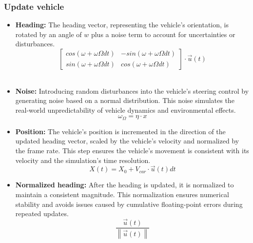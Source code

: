     \subsubsection*{Update vehicle}
    \begin{itemize}
	    \item \textbf{Heading:} The heading vector, representing the vehicle's orientation, is rotated by an angle of $w$ plus a noise term to account for uncertainties or disturbances.\\
        $$\begin{bmatrix}
	        cos(\omega + \omega{\Omega}dt) & -sin(\omega + \omega{\Omega}dt) \\
    	    sin(\omega + \omega{\Omega}dt) & cos(\omega + \omega{\Omega}dt)
        \end{bmatrix}
        \cdot \vec{u}(t)$$\\
	    \item \textbf{Noise:} Introducing random disturbances into the vehicle's steering control by generating noise based on a normal distribution. This noise simulates the real-world unpredictability of vehicle dynamics and environmental effects.\\
		    $$\omega_{\Omega}=\eta\cdot x$$
	    \item \textbf{Position:} The vehicle's position is incremented in the direction of the updated heading vector, scaled by the vehicle's velocity and normalized by the frame rate. This step ensures the vehicle's movement is consistent with its velocity and the simulation's time resolution.\\
		    $$X(t)=X_0+V_{car}\cdot\vec{u}(t)dt$$
	    \item \textbf{Normalized heading:} After the heading is updated, it is normalized to maintain a consistent magnitude. This normalization ensures numerical stability and avoids issues caused by cumulative floating-point errors during repeated updates.\\
		    $$\dfrac{\vec{u}(t)}{\left\lVert \vec{u}(t)\right\rVert}$$
    \end{itemize}

